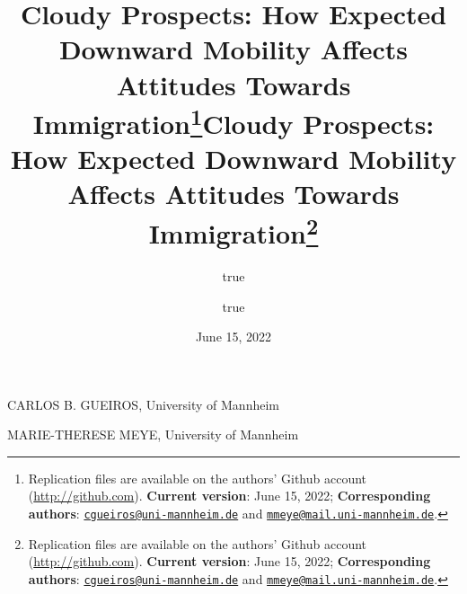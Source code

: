 \documentclass[
  11pt,
]{article}
\title{Cloudy Prospects: How Expected Downward Mobility Affects
Attitudes Towards Immigration\thanks{Replication files are available on
the authors' Github account (\url{http://github.com}). \textbf{Current
version}: June 15, 2022; \textbf{Corresponding authors}:
\href{mailto:cgueiros@uni-mannheim.de}{\nolinkurl{cgueiros@uni-mannheim.de}}
and
\href{mailto:mmeye@mail.uni-mannheim.de}{\nolinkurl{mmeye@mail.uni-mannheim.de}}.}}
\author{true \and true}
\date{June 15, 2022}
\title{Cloudy Prospects: How Expected Downward Mobility Affects
Attitudes Towards Immigration\thanks{Replication files are available on
the authors' Github account (\url{http://github.com}). \textbf{Current
version}: June 15, 2022; \textbf{Corresponding authors}:
\href{mailto:cgueiros@uni-mannheim.de}{\nolinkurl{cgueiros@uni-mannheim.de}}
and
\href{mailto:mmeye@mail.uni-mannheim.de}{\nolinkurl{mmeye@mail.uni-mannheim.de}}.}  }
\date{}
\begin{document}



{%
\setlength{\parindent}{0pt}
\thispagestyle{plain}
{%
\maketitle  %

}




{
   \vskip 13.5pt\relax \normalsize\fontsize{11}{12}
   \MakeUppercase{Carlos B. Gueiros}, \small{University of
Mannheim}   \par \vskip -3.5pt \MakeUppercase{Marie-Therese
Meye}, \small{University of Mannheim}   

}

}
\end{document}
